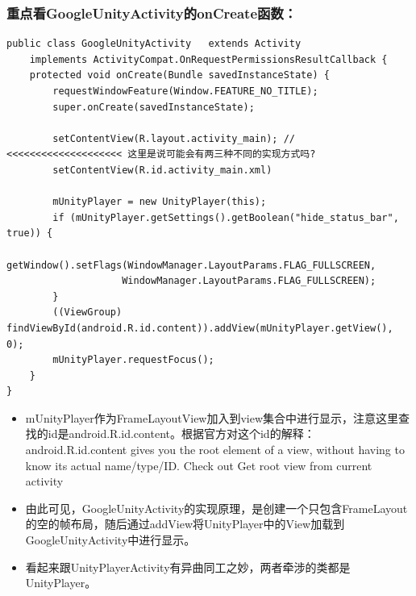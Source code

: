 \documentclass[9pt, b5paper]{article}
\begin{document}
\subsubsection{重点看GoogleUnityActivity的onCreate函数：}
\label{sec-1-2-3}
\begin{verbatim}
public class GoogleUnityActivity   extends Activity
    implements ActivityCompat.OnRequestPermissionsResultCallback {
    protected void onCreate(Bundle savedInstanceState) {
        requestWindowFeature(Window.FEATURE_NO_TITLE);
        super.onCreate(savedInstanceState);

        setContentView(R.layout.activity_main); // <<<<<<<<<<<<<<<<<<<< 这里是说可能会有两三种不同的实现方式吗?
        setContentView(R.id.activity_main.xml)

        mUnityPlayer = new UnityPlayer(this);
        if (mUnityPlayer.getSettings().getBoolean("hide_status_bar", true)) {
            getWindow().setFlags(WindowManager.LayoutParams.FLAG_FULLSCREEN,
                    WindowManager.LayoutParams.FLAG_FULLSCREEN);
        }
        ((ViewGroup) findViewById(android.R.id.content)).addView(mUnityPlayer.getView(), 0);
        mUnityPlayer.requestFocus();
    }
}
\end{verbatim}
\begin{itemize}
\item mUnityPlayer作为FrameLayoutView加入到view集合中进行显示，注意这里查找的id是android.R.id.content。根据官方对这个id的解释：android.R.id.content gives you the root element of a view, without having to know its actual name/type/ID. Check out Get root view from current activity
\item 由此可见，GoogleUnityActivity的实现原理，是创建一个只包含FrameLayout的空的帧布局，随后通过addView将UnityPlayer中的View加载到GoogleUnityActivity中进行显示。
\item 看起来跟UnityPlayerActivity有异曲同工之妙，两者牵涉的类都是UnityPlayer。
\end{itemize}
\end{document}
